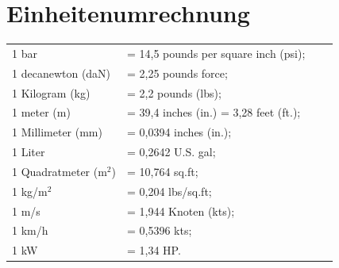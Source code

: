 \section{Einheitenumrechnung}
\begin{tabular}{p{}p{}ll}
1 bar & = 14,5 pounds per square inch (psi);\\
1 decanewton (daN)& = 2,25 pounds force;\\
1 Kilogram (kg) & = 2,2 pounds (lbs);\\
1 meter (m) & = 39,4 inches (in.) = 3,28 feet (ft.);\\
1 Millimeter (mm) & = 0,0394 inches (in.);\\
1 Liter & = 0,2642 U.S. gal; \\ 
1 Quadratmeter (m$^2$) &= 10,764 sq.ft;\\
1 kg/m$^2$ &= 0,204 lbs/sq.ft;\\
1 m/s & = 1,944 Knoten (kts);\\
1 km/h & = 0,5396 kts;\\
1 kW & = 1,34 HP.
\end{tabular}
